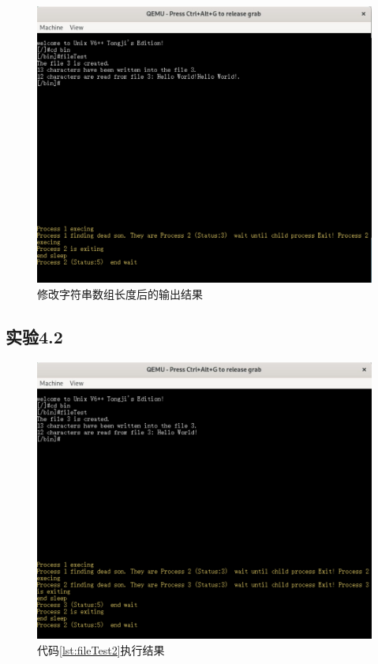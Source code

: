 \begin{figure}[!htbp]
    \centering
    \includegraphics[width=\textwidth]{images/p112.png}
    \caption{修改字符串数组长度后的输出结果}\label{p112}
\end{figure}
\clearpage


\subsection{实验4.2}

\begin{figure}[!htbp]
    \centering
    \includegraphics[width=\textwidth]{images/p2.png}
    \caption{代码\ref{lst:fileTest2}执行结果}\label{p2}
\end{figure}

